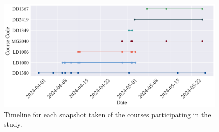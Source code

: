 \begin{figure}[H]
    \centering
    \includegraphics[width=1\textwidth]{results/plots/assets/performance-01-timeline-of-snapshots-taken.png}
    \caption{Timeline for each snapshot taken of the courses participating in the study.}
    \label{fig:performance_01_timeline_of_snapshots_taken}
\end{figure}